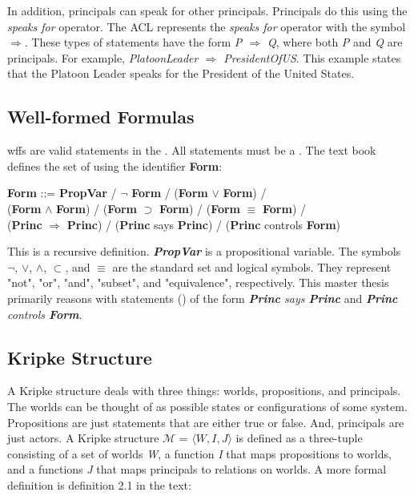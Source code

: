 \documentclass[../../main/main.tex]{subfiles}
\begin{document}
In addition, principals can speak for other principals.  Principals do this using the \textit{speaks for} operator.  The ACL represents the \textit{speaks for} operator with the symbol $\Rightarrow$.  These types of statements have the form \textit{P $\Rightarrow$ Q}, where both \textit{P} and \textit{Q} are principals.  For example, \textit{PlatoonLeader $\Rightarrow$ PresidentOfUS}.  This example states that the Platoon Leader speaks for the President of the United States.  

\subsection{Well-formed Formulas}\label{ssec:wff}
\Glspl{wff} are valid statements in the .  All  statements must be a .  The text book defines the set of  using the identifier \textbf{Form}:

\begin{center}
\textbf{Form} ::= \textbf{PropVar} / $\neg$ \textbf{Form} / (\textbf{Form} $\vee$ \textbf{Form}) / \\ 
	                  (\textbf{Form} $\wedge$ \textbf{Form}) / (\textbf{Form} $\supset$ \textbf{Form}) / (\textbf{Form} $\equiv$ \textbf{Form}) / \\
	                  (\textbf{Princ} $\Rightarrow$ \textbf{Princ}) / (\textbf{Princ} says \textbf{Princ}) / (\textbf{Princ} controls \textbf{Form})
\end{center}

This is a recursive definition.  \textbf{\textit{PropVar}} is a propositional variable.  The symbols $\neg$, $\vee$, $\wedge$, $\subset$, and $\equiv$ are the standard set and logical symbols.  They represent "not", "or", "and", "subset", and "equivalence", respectively.  This master thesis primarily reasons with statements () of the form \textit{\textbf{Princ} says \textbf{Princ}} and \textit{\textbf{Princ} controls \textbf{Form}}.

\subsection{Kripke Structure}\label{ssec:kripke}
A Kripke structure deals with three things: worlds, propositions, and principals.  The worlds can be thought of as possible states or configurations of some system.  Propositions are just statements that are either true or false.  And, principals are just actors.  A Kripke structure $\mathcal{M}$ = $\langle \textit{W}, \textit{I}, \textit{J} \rangle $  is defined as a three-tuple consisting of a set of worlds \textit{W}, a function \textit{I} that maps propositions to worlds, and a functions \textit{J} that maps principals to relations on worlds.  A more formal definition is definition 2.1 in the text:
\end{document}
